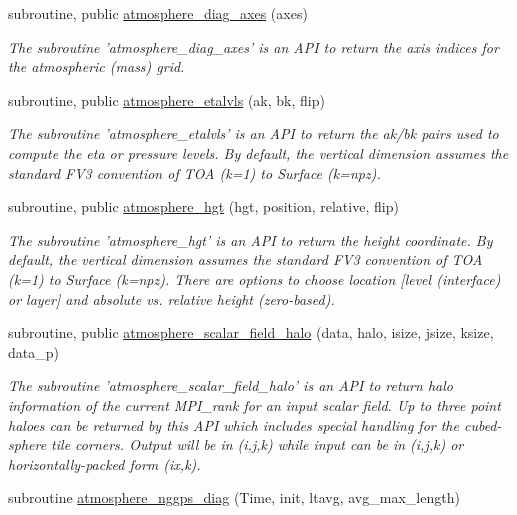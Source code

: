 \begin{DoxyCompactItemize}
subroutine, public \hyperlink{classatmosphere__mod_af5d819faa34aef7024501c7696540bf0}{atmosphere\-\_\-diag\-\_\-axes} (axes)
\begin{DoxyCompactList}\small\item\em The subroutine 'atmosphere\-\_\-diag\-\_\-axes' is an A\-P\-I to return the axis indices for the atmospheric (mass) grid. \end{DoxyCompactList}\item 
subroutine, public \hyperlink{classatmosphere__mod_ad2c962b25778b4cbd91b48874a52ab95}{atmosphere\-\_\-etalvls} (ak, bk, flip)
\begin{DoxyCompactList}\small\item\em The subroutine 'atmosphere\-\_\-etalvls' is an A\-P\-I to return the ak/bk pairs used to compute the eta or pressure levels.  By default, the vertical dimension assumes the standard F\-V3 convention of T\-O\-A (k=1) to Surface (k=npz). \end{DoxyCompactList}\item 
subroutine, public \hyperlink{classatmosphere__mod_af16043b77ee4e18b8a8497ad49cfd670}{atmosphere\-\_\-hgt} (hgt, position, relative, flip)
\begin{DoxyCompactList}\small\item\em The subroutine 'atmosphere\-\_\-hgt' is an A\-P\-I to return the height coordinate.  By default, the vertical dimension assumes the standard F\-V3 convention of T\-O\-A (k=1) to Surface (k=npz). There are options to choose location \mbox{[}level (interface) or layer\mbox{]} and absolute vs. relative height (zero-\/based). \end{DoxyCompactList}\item 
subroutine, public \hyperlink{classatmosphere__mod_af9fa6ffe6500a97af113b7a6afb348a6}{atmosphere\-\_\-scalar\-\_\-field\-\_\-halo} (data, halo, isize, jsize, ksize, data\-\_\-p)
\begin{DoxyCompactList}\small\item\em The subroutine 'atmosphere\-\_\-scalar\-\_\-field\-\_\-halo' is an A\-P\-I to return halo information of the current M\-P\-I\-\_\-rank for an input scalar field.  Up to three point haloes can be returned by this A\-P\-I which includes special handling for the cubed-\/sphere tile corners. Output will be in (i,j,k) while input can be in (i,j,k) or horizontally-\/packed form (ix,k). \end{DoxyCompactList}\item 
subroutine \hyperlink{classatmosphere__mod_a14deefffccb54e6af9cf0680f1b3823a}{atmosphere\-\_\-nggps\-\_\-diag} (Time, init, ltavg, avg\-\_\-max\-\_\-length)

\end{DoxyCompactItemize}
